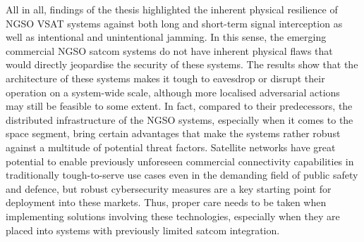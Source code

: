 \documentclass[english, 12pt, a4paper, elec, utf8, a-1b, online]{aaltothesis}
\begin{document}
All in all, findings of the thesis highlighted the inherent physical resilience of NGSO VSAT systems against both long and short-term signal interception as well as intentional and unintentional jamming.
In this sense, the emerging commercial NGSO satcom systems do not have inherent physical flaws that would directly jeopardise the security of these systems.
The results show that the architecture of these systems makes it tough to eavesdrop or disrupt their operation on a system-wide scale, although more localised adversarial actions may still be feasible to some extent.
In fact, compared to their predecessors, the distributed infrastructure of the NGSO systems, especially when it comes to the space segment, bring certain advantages that make the systems rather robust against a multitude of potential threat factors.
Satellite networks have great potential to enable previously unforeseen commercial connectivity capabilities in traditionally tough-to-serve use cases even in the demanding field of public safety and defence, but robust cybersecurity measures are a key starting point for deployment into these markets.
Thus, proper care needs to be taken when implementing solutions involving these technologies, especially when they are placed into systems with previously limited satcom integration.

\clearpage

\thesisbibliography




\clearpage

\thesisappendix

\end{document}

